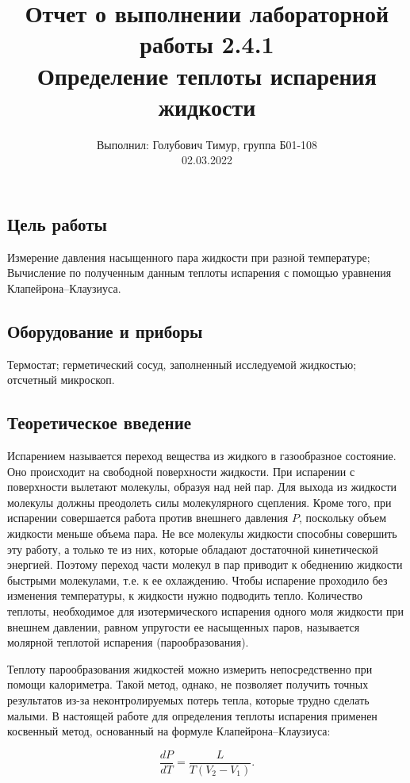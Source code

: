 \documentclass[12pt,a4paper]{article}
\author{\normalsize Выполнил: Голубович Тимур, группа Б01-108 \\
	\normalsize 02.03.2022}
\date{}
\title{
	\large Отчет о выполнении лабораторной работы 2.4.1 \\
	\Large Определение теплоты испарения жидкости \\ 
	
}
\begin{document}
	\maketitle
	\subsection*{Цель работы} 
	 Измерение давления насыщенного пара жидкости при разной температуре;
	 Вычисление по полученным данным теплоты испарения с помощью уравнения Клапейрона–Клаузиуса.
	
	\subsection*{Оборудование и приборы} Термостат; герметический сосуд, заполненный исследуемой жидкостью; отсчетный микроскоп.
	
	
\subsection*{Теоретическое введение}

Испарением называется переход вещества из жидкого в газообразное состояние. Оно происходит на свободной поверхности жидкости. При испарении с поверхности вылетают молекулы, образуя над ней пар. Для выхода из жидкости молекулы должны преодолеть силы молекулярного сцепления. Кроме того, при испарении совершается работа против внешнего давления $ P $, поскольку объем жидкости меньше объема пара. Не все молекулы жидкости способны совершить эту работу, а только те из них, которые обладают достаточной кинетической энергией. Поэтому переход части молекул в пар приводит к обеднению жидкости быстрыми молекулами, т.е. к ее охлаждению. Чтобы испарение проходило без изменения температуры, к жидкости нужно подводить тепло. Количество теплоты, необходимое для изотермического испарения одного моля жидкости при внешнем давлении, равном упругости ее насыщенных паров, называется молярной теплотой испарения (парообразования).

Теплоту парообразования жидкостей можно измерить непосредственно при помощи калориметра. Такой метод, однако, не позволяет получить точных результатов из-за неконтролируемых потерь тепла, которые трудно сделать малыми. В настоящей работе для определения теплоты испарения применен косвенный метод, основанный на формуле Клапейрона–Клаузиуса:

\begin{equation}\label{Kl-Kl}
	\frac{dP}{dT}=\frac{L}{T\left(V_2-V_1\right)}.
\end{equation}
\end{document}
